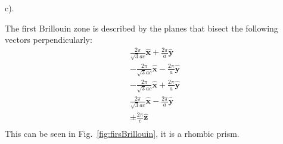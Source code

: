 \documentclass[a4paper,12pt]{article}
\newcommand\uv[1]{\pmb{\hat {#1}}}
\begin{document}
\begin{minipage}[t]{0.9\textwidth}
  c).
  \begin{minipage}[t]{\textwidth}
    The first Brillouin zone is described by the planes that bisect the following vectors perpendicularly:
    \begin{gather*}
      \frac{2 \pi}{\sqrt{3}ac} \uv{x} + \frac{2\pi}{a}\uv{y}\\
      - \frac{2 \pi}{\sqrt{3}ac} \uv{x} - \frac{2\pi}{a}\uv{y}\\
      -\frac{2 \pi}{\sqrt{3}ac} \uv{x} + \frac{2\pi}{a}\uv{y}\\
      \frac{2 \pi}{\sqrt{3}ac} \uv{x} - \frac{2\pi}{a}\uv{y}\\
      \pm \frac{2 \pi}{c} \uv{z}\\
    \end{gather*}
    This can be seen in Fig.~\ref{fig:firsBrillouin},
    it is a rhombic prism.
  \end{minipage}
\end{minipage}
\end{document}
